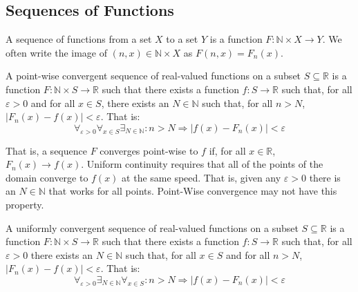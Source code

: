         \subsection{Sequences of Functions}
            \begin{definition}
                A sequence of functions from a
                set $X$ to a set $Y$ is a function
                $F:\mathbb{N}\times{X}\rightarrow{Y}$.
                We often write the image of
                $(n,x)\in\mathbb{N}\times{X}$ as
                $F(n,x)=F_{n}(x)$.
            \end{definition}
            \begin{definition}
                A point-wise convergent
                sequence of real-valued functions on
                a subset $S\subseteq\mathbb{R}$
                is a function
                $F:\mathbb{N}\times{S}\rightarrow\mathbb{R}$
                such that there exists a function
                $f:S\rightarrow\mathbb{R}$ such that,
                for all $\varepsilon>0$ and for all
                $x\in{S}$, there exists an
                $N\in\mathbb{N}$ such that, for all
                $n>N$, $|F_{n}(x)-f(x)|<\varepsilon$.
                That is:
                \begin{equation}
                    \label{eqn:FUNCTIONAL_ANALYSIS:POINTWISE_CONV_DEF}
                    \forall_{\varepsilon>0}
                    \forall_{x\in{S}}
                    \exists_{N\in\mathbb{N}}:
                    n>N\Rightarrow
                    |f(x)-F_{n}(x)|<\varepsilon
                \end{equation}
            \end{definition}
            That is, a sequence $F$ converges point-wise
            to $f$ if, for all $x\in\mathbb{R}$,
            $F_{n}(x)\rightarrow{f(x)}$.
            Uniform continuity requires that all of the
            points of the domain converge to $f(x)$ at
            the same speed. That is, given any $\varepsilon>0$
            there is an $N\in\mathbb{N}$ that works for
            all points. Point-Wise convergence may not
            have this property.
            \begin{definition}
                A uniformly convergent
                sequence of real-valued functions on
                a subset $S\subseteq\mathbb{R}$
                is a function
                $F:\mathbb{N}\times{S}\rightarrow\mathbb{R}$
                such that there exists a function
                $f:S\rightarrow\mathbb{R}$ such that,
                for all $\varepsilon>0$ there exists
                an $N\in\mathbb{N}$ such that, for all
                $x\in{S}$ and for all
                $n>N$, $|F_{n}(x)-f(x)|<\varepsilon$.
                That is:
                \begin{equation}
                    \label{eqn:FUNCTIONAL_ANALYSIS:UNIFORM_CONV_DEF}
                    \forall_{\varepsilon>0}
                    \exists_{N\in\mathbb{N}}
                    \forall_{x\in{S}}:
                    n>N\Rightarrow
                    |f(x)-F_{n}(x)|<\varepsilon
                \end{equation}
            \end{definition}
